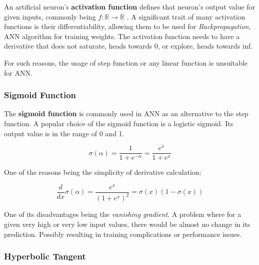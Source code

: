 An artificial neuron's \textbf{activation function} defines that neuron's output value for given inputs, commonly being ${f: \mathbb{R} \rightarrow \mathbb{R}}$ \cite{leskovec2020mining}. A significant trait of many activation functions is their differentiability, allowing them to be used for \textit{Backpropagation}, ANN algorithm for training weights. The activation function needs to have a derivative that does not saturate, heads towards 0, or explore, heads towards inf.\cite{matous}

For such reasons, the usage of step function or any linear function is unsuitable for ANN.
\subsubsection{Sigmoid Function}
The \textbf{sigmoid function} is commonly used in ANN as an alternative to the step function. A popular choice of the sigmoid function is a logistic sigmoid. Its output value is in the range of 0 and 1.

\begin{equation}
    {\sigma(\alpha) = \frac{1}{1 + e^{-\alpha}} = \frac{e^x}{1 + e^{x}}}
\end{equation}




One of the reasons being the simplicity of derivative calculation:

\begin{equation}
    {\frac{d}{dx}\sigma(\alpha) = \frac{e^x}{(1 + e^{x})^2} = \sigma(x)(1-\sigma(x))}
\end{equation}


One of its disadvantages being the \textit{vanishing gradient}. A problem where for a given very high or very low input values, there would be almost no change in its prediction. Possibly resulting in training complications or performance issues.\cite{7typesactivationfunctions}\cite{matous}


\subsubsection{Hyperbolic Tangent}

